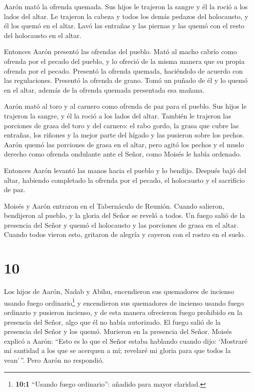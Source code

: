  Aarón mató la ofrenda quemada. Sus hijos le trajeron la
sangre y él la roció a los lados del altar.  Le trajeron la
cabeza y todos los demás pedazos del holocausto, y él los quemó en el
altar.  Lavó las entrañas y las piernas y las quemó con el
resto del holocausto en el altar.

 Entonces Aarón presentó las ofrendas del pueblo. Mató al
macho cabrío como ofrenda por el pecado del pueblo, y lo ofreció de la
misma manera que su propia ofrenda por el pecado.  Presentó
la ofrenda quemada, haciéndolo de acuerdo con las regulaciones.
 Presentó la ofrenda de grano. Tomó un puñado de él y lo
quemó en el altar, además de la ofrenda quemada presentada esa mañana.

 Aarón mató al toro y al carnero como ofrenda de paz para
el pueblo. Sus hijos le trajeron la sangre, y él la roció a los lados
del altar.  También le trajeron las porciones de grasa del
toro y del carnero: el rabo gordo, la grasa que cubre las entrañas, los
riñones y la mejor parte del hígado  y las pusieron sobre
los pechos. Aarón quemó las porciones de grasa en el altar,
 pero agitó los pechos y el muslo derecho como ofrenda
ondulante ante el Señor, como Moisés le había ordenado.

 Entonces Aarón levantó las manos hacia el pueblo y lo
bendijo. Después bajó del altar, habiendo completado la ofrenda por el
pecado, el holocausto y el sacrificio de paz.

 Moisés y Aarón entraron en el Tabernáculo de Reunión.
Cuando salieron, bendijeron al pueblo, y la gloria del Señor se reveló a
todos.  Un fuego salió de la presencia del Señor y quemó el
holocausto y las porciones de grasa en el altar. Cuando todos vieron
esto, gritaron de alegría y cayeron con el rostro en el suelo.

\hypertarget{section-9}{%
\section{10}\label{section-9}}

 Los hijos de Aarón, Nadab y Abihu, encendieron sus
quemadores de incienso usando fuego ordinario\footnote{\textbf{10:1}
  ``Usando fuego ordinario'': añadido para mayor claridad.} y
encendieron sus quemadores de incienso usando fuego ordinario y pusieron
incienso, y de esta manera ofrecieron fuego prohibido en la presencia
del Señor, algo que él no había autorizado.  El fuego salió
de la presencia del Señor y los quemó. Murieron en la presencia del
Señor.  Moisés explicó a Aarón: ``Esto es lo que el Señor
estaba hablando cuando dijo: `Mostraré mi santidad a los que se acerquen
a mí; revelaré mi gloria para que todos la vean'\,''. Pero Aarón no
respondió.

